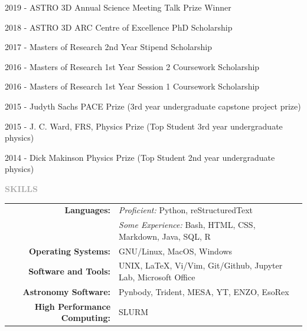 \documentclass[11pt]{extarticle}
\def\Vhrulefill{{\color{BurntOrange}{\leavevmode\leaders\hrule height 1.2ex depth \dimexpr0.5pt-0.9ex\hfill\kern5pt}}}
\begin{document}
2019 - ASTRO 3D Annual Science Meeting Talk Prize Winner \par
2018 - ASTRO 3D ARC Centre of Excellence PhD Scholarship \par
2017 - Masters of Research 2nd Year Stipend Scholarship \par
2016 - Masters of Research 1st Year Session 2 Coursework Scholarship  \par
2016 - Masters of Research 1st Year Session 1 Coursework Scholarship  \par
2015 - Judyth Sachs PACE Prize (3rd year undergraduate capstone project prize)  \par
2015 - J. C. Ward, FRS, Physics Prize (Top Student 3rd year undergraduate physics) \par 
2014 - Dick Makinson Physics Prize  (Top Student 2nd year undergraduate physics) \par 















\vspace{3ex}
\noindent
\textcolor{darkgray}{\Large\normalfont\bfseries\MakeUppercase{Skills}} \Vhrulefill
\vspace{2ex} 

\noindent
\begin{tabular}{rl}
\textbf{Languages:} & \emph{Proficient:} Python, reStructuredText \\
& \emph{Some Experience:} Bash, HTML, CSS, Markdown, Java, SQL, R \\
\textbf{Operating Systems:} & GNU/Linux, MacOS, Windows\\
\textbf{Software and Tools:} & UNIX, \LaTeX, Vi/Vim, Git/Github, Jupyter Lab, Microsoft Office \\
\textbf{Astronomy Software:} & Pynbody, Trident, MESA, YT, ENZO, EsoRex \\
\textbf{High Performance Computing:} & SLURM
\end{tabular}
\end{document}
